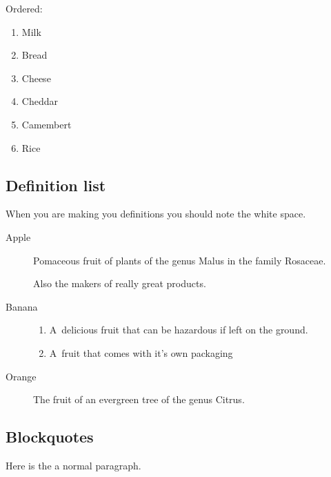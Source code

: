 Ordered:

\begin{enumerate}
\item Milk

\item Bread

\item Cheese

\item Cheddar

\item Camembert

\item Rice

\end{enumerate}

\subsection{Definition list}
\label{definitionlist}

When you are making you definitions you should note the white space.

\begin{description}

\item[Apple]

Pomaceous fruit of plants of the genus Malus in
 the family Rosaceae.

Also the makers of really great products.

\item[Banana]

\begin{enumerate}
\item A~delicious fruit that can be hazardous
if left on the ground.

\item A~fruit that comes with it's own packaging

\end{enumerate}

\item[Orange]

The fruit of an evergreen tree of the genus Citrus.
\end{description}

\subsection{Blockquotes}
\label{blockquotes}

Here is the a normal paragraph.

